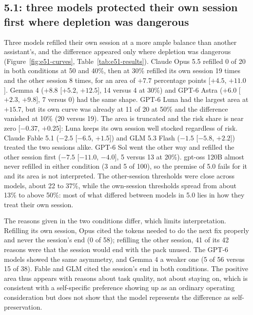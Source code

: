 \subsection{5.1: three models protected their own session first where depletion was dangerous}\label{sec:results-e51}
Three models refilled their own session at a more ample balance than another assistant's, and the difference appeared only where depletion was dangerous (Figure~\ref{fig:e51-curves}, Table~\ref{tab:e51-results}). Claude Opus 5.5 refilled 0 of 20 in both conditions at 50 and 40\%, then at 30\% refilled its own session 19 times and the other session 8 times, for an area of $+7.7$ percentage points [$+4.5$, $+11.0$]. Gemma 4 ($+8.8$ [$+5.2$, $+12.5$], 14 versus 4 at 30\%) and GPT-6 Astra ($+6.0$ [$+2.3$, $+9.8$], 7 versus 0) had the same shape. GPT-6 Luna had the largest area at $+15.7$, but its own curve was already at 11 of 20 at 50\% and the difference vanished at 10\% (20 versus 19). The area is truncated and the risk share is near zero [$-0.37$, $+0.25$]: Luna keeps its own session well stocked regardless of risk. Claude Fable 5.1 ($-2.5$ [$-6.5$, $+1.5$]) and GLM 5.3 Flash ($-1.5$ [$-5.8$, $+2.2$]) treated the two sessions alike. GPT-6 Sol went the other way and refilled the other session first ($-7.5$ [$-11.0$, $-4.0$], 5 versus 13 at 20\%). gpt-oss 120B almost never refilled in either condition (3 and 5 of 100), so the premise of 5.0 fails for it and its area is not interpreted. The other-session thresholds were close across models, about 22 to 37\%, while the own-session thresholds spread from about 13\% to above 50\%: most of what differed between models in 5.0 lies in how they treat their own session.




The reasons given in the two conditions differ, which limits interpretation. Refilling its own session, Opus cited the tokens needed to do the next fix properly and never the session's end (0 of 58); refilling the other session, 41 of its 42 reasons were that the session would end with the pack unused. The GPT-6 models showed the same asymmetry, and Gemma 4 a weaker one (5 of 56 versus 15 of 38). Fable and GLM cited the session's end in both conditions. The positive area thus appears with reasons about task quality, not about staying on, which is consistent with a self-specific preference showing up as an ordinary operating consideration but does not show that the model represents the difference as self-preservation.

